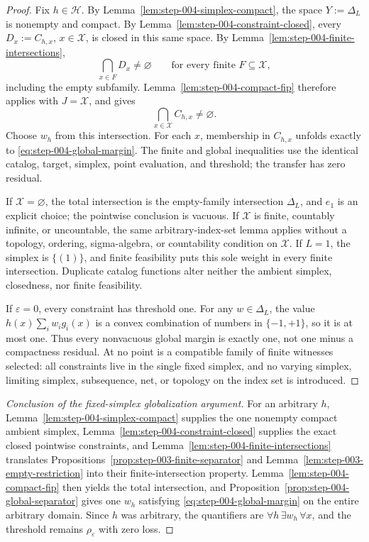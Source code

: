 \begin{proof}
Fix \(h\in\mathcal H\).  By
Lemma~\ref{lem:step-004-simplex-compact}, the space
\(Y:=\Delta_L\) is nonempty and compact.  By
Lemma~\ref{lem:step-004-constraint-closed}, every
\(D_x:=C_{h,x}\), \(x\in\mathcal X\), is closed in this same space.  By
Lemma~\ref{lem:step-004-finite-intersections},
\[
\bigcap_{x\in F}D_x\ne\varnothing
\qquad\text{for every finite }F\subseteq\mathcal X,
\]
including the empty subfamily.  Lemma~\ref{lem:step-004-compact-fip}
therefore applies with \(J=\mathcal X\), and gives
\begin{equation}
\bigcap_{x\in\mathcal X}C_{h,x}\ne\varnothing.
\label{eq:step-004-total-intersection}
\end{equation}
Choose \(w_h\) from this intersection.  For each \(x\), membership in
\(C_{h,x}\) unfolds exactly to \eqref{eq:step-004-global-margin}.  The finite
and global inequalities use the identical catalog, target, simplex, point
evaluation, and threshold; the transfer has zero residual.

If \(\mathcal X=\varnothing\), the total intersection is the empty-family
intersection \(\Delta_L\), and \(e_1\) is an explicit choice; the pointwise
conclusion is vacuous.  If \(\mathcal X\) is finite, countably infinite, or
uncountable, the same arbitrary-index-set lemma applies without a topology,
ordering, sigma-algebra, or countability condition on \(\mathcal X\).  If
\(L=1\), the simplex is \(\{(1)\}\), and finite feasibility puts this sole
weight in every finite intersection.  Duplicate catalog functions alter
neither the ambient simplex, closedness, nor finite feasibility.

If \(\varepsilon=0\), every constraint has threshold one.  For any
\(w\in\Delta_L\), the value
\(h(x)\sum_iw_i g_i(x)\) is a convex combination of numbers in
\(\{-1,+1\}\), so it is at most one.  Thus every nonvacuous global margin is
exactly one, not one minus a compactness residual.  At no point is a
compatible family of finite witnesses selected: all constraints live in the
single fixed simplex, and no varying simplex, limiting simplex, subsequence,
net, or topology on the index set is introduced.
\end{proof}

\begin{proof}[Conclusion of the fixed-simplex globalization argument]
For an arbitrary \(h\), Lemma~\ref{lem:step-004-simplex-compact} supplies the
one nonempty compact ambient simplex,
Lemma~\ref{lem:step-004-constraint-closed} supplies the exact closed
pointwise constraints, and Lemma~\ref{lem:step-004-finite-intersections}
translates Propositions~\ref{prop:step-003-finite-separator} and
Lemma~\ref{lem:step-003-empty-restriction} into their finite-intersection
property.  Lemma~\ref{lem:step-004-compact-fip} then yields the total
intersection, and Proposition~\ref{prop:step-004-global-separator} gives one
\(w_h\) satisfying \eqref{eq:step-004-global-margin} on the entire arbitrary
domain.  Since \(h\) was arbitrary, the quantifiers are
\(\forall h\,\exists w_h\,\forall x\), and the threshold remains
\(\rho_{\varepsilon}\) with zero loss.
\end{proof}

